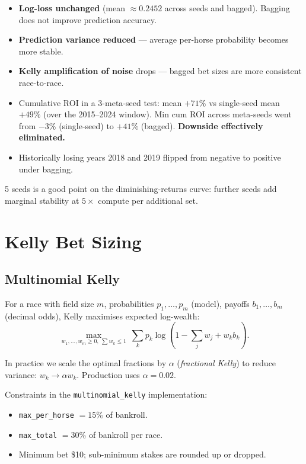 \documentclass[11pt]{article}
\begin{document}
\begin{itemize}\item \textbf{Log-loss unchanged} (mean $\approx 0.2452$ across seeds and
      bagged). Bagging does not improve prediction accuracy.
\item \textbf{Prediction variance reduced} --- average per-horse
      probability becomes more stable.
\item \textbf{Kelly amplification of noise} drops --- bagged bet sizes
      are more consistent race-to-race.
\item Cumulative ROI in a 3-meta-seed test: mean $+71\%$ vs single-seed
      mean $+49\%$ (over the 2015--2024 window). Min cum ROI across meta-seeds
      went from $-3\%$ (single-seed) to $+41\%$ (bagged). \textbf{Downside
      effectively eliminated.}
\item Historically losing years 2018 and 2019 flipped from negative to
      positive under bagging.
\end{itemize}

5 seeds is a good point on the diminishing-returns curve: further seeds
add marginal stability at $5\times$ compute per additional set.

\section{Kelly Bet Sizing}

\subsection{Multinomial Kelly}

For a race with field size $m$, probabilities $p_1,\dots,p_m$
(model), payoffs $b_1,\dots,b_m$ (decimal odds), Kelly maximises
expected log-wealth:
\[
\max_{w_1,\dots,w_m \geq 0,\ \sum w_k \leq 1}\ \sum_k p_k \log\!\left(1 - \sum_j w_j + w_k b_k\right).
\]

In practice we scale the optimal fractions by $\alpha$
(\emph{fractional Kelly}) to reduce variance:
$w_k \to \alpha w_k$. Production uses $\alpha = 0.02$.

Constraints in the \texttt{multinomial\_kelly} implementation:
\begin{itemize}\item \texttt{max\_per\_horse} $= 15\%$ of bankroll.
\item \texttt{max\_total} $= 30\%$ of bankroll per race.
\item Minimum bet \$10; sub-minimum stakes are rounded up or dropped.
\end{itemize}
\end{document}
